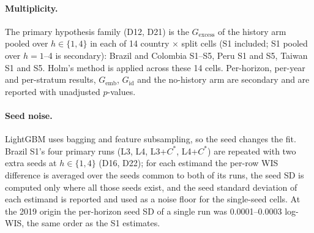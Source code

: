 \documentclass[11pt]{article}
\newcommand{\Gemb}{G_{\mathrm{emb}}}
\newcommand{\Gid}{G_{\mathrm{id}}}
\newcommand{\Gex}{G_{\mathrm{excess}}}
\newcommand{\Cstar}{C^{\ast}}
\begin{document}
\paragraph{Multiplicity.}
The primary hypothesis family (D12, D21) is the $\Gex$ of the history arm pooled over $h\in\{1,4\}$
in each of 14 country $\times$ split cells (S1 included; S1 pooled over $h=1$--4 is secondary): Brazil and Colombia S1--S5, Peru S1 and S5, Taiwan S1 and S5. Holm's method
\citep{holm1979simple} is applied across these 14 cells. Per-horizon, per-year and per-stratum results,
$\Gemb$, $\Gid$ and the no-history arm are secondary and are reported with unadjusted $p$-values.

\paragraph{Seed noise.}
LightGBM uses bagging and feature subsampling, so the seed changes the fit. Brazil S1's four primary runs
(L3, L4, L3+$\Cstar$, L4+$\Cstar$) are repeated with two extra seeds at $h\in\{1,4\}$ (D16, D22); for each
estimand the per-row WIS difference is averaged over the seeds common to both of its runs, the seed SD is
computed only where all those seeds exist, and the seed standard deviation of each estimand is reported
and used as a noise floor for the single-seed cells. At the 2019 origin the per-horizon seed SD of a
single run was 0.0001--0.0003 log-WIS, the same order as the S1 estimates.
\end{document}
